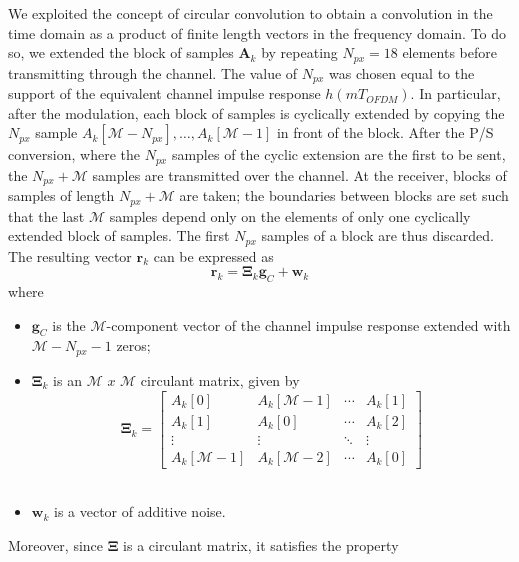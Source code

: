 \documentclass[a4paper, 12pt]{report}
\begin{document}
We exploited the concept of circular convolution to obtain a convolution in the time domain as a product of finite length vectors in the frequency domain. To do so, we extended the block of samples $\mathbf{A}_k$ by repeating $N_{px}=18$ elements before transmitting through the channel. The value of $N_{px}$ was chosen equal to the support of the equivalent channel impulse response $h(mT_{OFDM})$. In particular, after the modulation, each block of samples is cyclically extended by copying the $N_{px}$ sample $A_k[\mathcal{M}-N_{px}],\dots,A_k[\mathcal{M}-1]$ in front of the block. After the P/S conversion, where the $N_{px}$ samples of the cyclic extension are the first to be sent, the $N_{px}+\mathcal{M}$ samples are transmitted over the channel.  At the receiver, blocks of samples of length $N_{px}+\mathcal{M}$ are taken; the boundaries between blocks are set such that the last $\mathcal{M}$ samples depend only on the elements of only one cyclically extended block of samples. The first $N_{px}$ samples of a block are thus discarded. \\
The resulting vector $\mathbf{r}_k$ can be expressed as 
\begin{equation}
\mathbf{r}_k = \mathbf{\Xi}_k\mathbf{g}_C + \mathbf{w}_k
\end{equation}
where 

\begin{itemize}
	\item $\mathbf{g}_C$ is the $\mathcal{M}$-component vector of the channel impulse response extended with $\mathcal{M}-N_{px}-1$ zeros;
	\item $\mathbf{\Xi}_k$ is an $\mathcal{M}$ $x$ $\mathcal{M}$ circulant matrix, given by
	\begin{equation*}
	\mathbf{\Xi}_k = \begin{bmatrix}
						A_k[0] & A_k[\mathcal{M}-1] & \cdots & A_k[1] \\
						A_k[1] & A_k[0] & \cdots & A_k[2] \\
						\vdots & \vdots & \ddots & \vdots \\
						A_k[\mathcal{M}-1] & A_k[\mathcal{M}-2] & \cdots & A_k[0]
	\end{bmatrix}
	\end{equation*} \\
	
	\item $ \mathbf{w}_k$ is a vector of additive noise. 
\end{itemize}

Moreover, since $\mathbf{\Xi}$ is a circulant matrix, it satisfies the property
\end{document}
